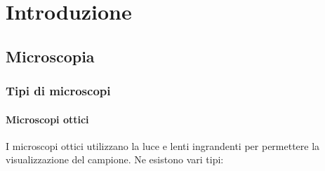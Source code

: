 \chapter{Introduzione}
\section{Microscopia}
\subsection{Tipi di microscopi}
\subsubsection{Microscopi ottici}
I microscopi ottici utilizzano la luce e lenti ingrandenti per permettere la visualizzazione del campione. Ne esistono vari tipi:
